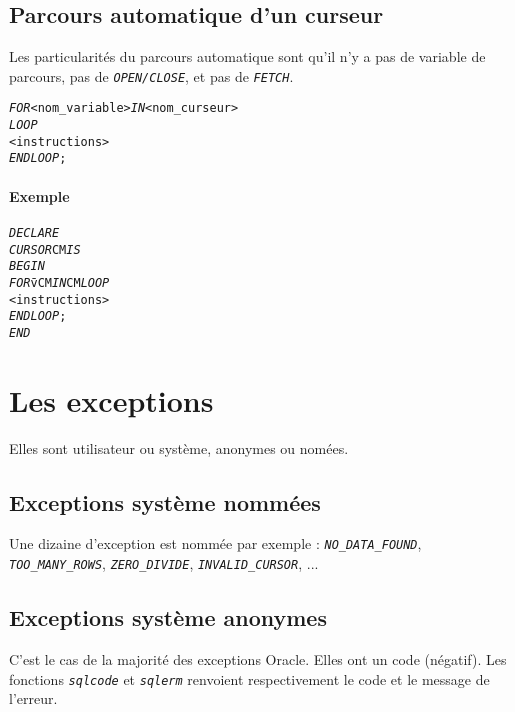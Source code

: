 \documentclass[10pt]{article}
\begin{document}
		\subsection{Parcours automatique d'un curseur}
			Les particularités du parcours automatique sont qu'il n'y a pas de variable de parcours, pas de \emph{\texttt{OPEN/CLOSE}}, et pas de \emph{\texttt{FETCH}}.
			
				\begin{alltt}
					\begin{tabbing}
						\emph{FOR} <nom_variable> \emph{IN} <nom_curseur>\\
						\emph{LOOP} \=\\
							\><instructions>\\
						\emph{END LOOP};
					\end{tabbing}
				\end{alltt}
				
				\paragraph{Exemple}
					\begin{alltt}
						\begin{tabbing}
							\emph{DECLARE}\=\\
								\>\emph{CURSOR} CM \emph{IS}\\
							\emph{BEGIN}\>\\
								\>\emph{FOR} \=vCM \emph{IN} CM \emph{LOOP}\\
									\>\><instructions>\\
								\>\emph{END LOOP};\\
							\emph{END}
						\end{tabbing}
					\end{alltt}
					
	\section{Les exceptions}
		Elles sont utilisateur ou système, anonymes ou nomées.
		
		\subsection{Exceptions système nommées}
			Une dizaine d'exception est nommée par exemple : \emph{\texttt{NO\_DATA\_FOUND}}, \emph{\texttt{TOO\_MANY\_ROWS}}, \emph{\texttt{ZERO\_DIVIDE}}, \emph{\texttt{INVALID\_CURSOR}}, ...
			
		\subsection{Exceptions système anonymes} 
			C'est le cas de la majorité des exceptions Oracle. Elles ont un code (négatif). Les fonctions \emph{\texttt{sqlcode}} et \emph{\texttt{sqlerm}} renvoient respectivement le code et le message de l'erreur.
			
\end{document}
